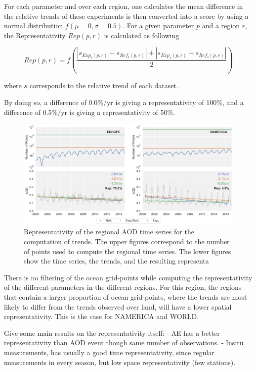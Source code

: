 \documentclass[journal abbreviation, manuscript]{copernicus}
\begin{document}
For each parameter and over each region, one calculates the mean difference in the relative trends of these experiments is then converted into a score by using a normal distribution $f(\mu=0, \sigma=0.5)$. For a given parameter $p$ and a region $r$, the Representativity $Rep(p,r)$ is calculated as following

\begin{equation}
 Rep(p, r) = f\left( \frac{\left| s_{Exp_{t}(p, r)}-s_{Ref_{t}(p, r)} \right| + \left| s_{Exp_{s}(p, r)}-s_{Ref_{s}(p, r)}\right| }{2} \right)
\end{equation}

where $s$ corresponds to the relative trend of each dataset.

By doing so, a difference of 0.0\%/yr is giving a representativity of 100\%, and a difference of 0.5\%/yr is giving a representativity of 50\%.

\begin{figure}
 \includegraphics[width=\columnwidth]{../scripts/figs/representativity.png}
 \caption{Representativity of the regional AOD time series for the computation of trends. The upper figures correspond to the number of points used to compute the regional time series. The lower figures show the time series, the trends, and the resulting representa}
 \label{representativity}
\end{figure}

There is no filtering of the ocean grid-points while computing the representativity of the different parameters in the different regions. For this region, the regions that contain a larger proportion of ocean grid-points, where the trends are most likely to differ from the trends observed over land, will have a lower spatial representativity. This is the case for NAMERICA and WORLD.

Give some main results on the representativity itself:
- AE has a better representativity than AOD event though same number of observations.
- Insitu measurements, has usually a good time representativity, since regular measurements in every season, but low space representativity (few stations).
\end{document}

